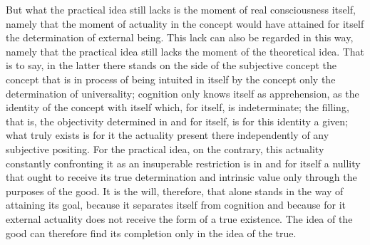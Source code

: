 But what the practical idea still lacks is the moment of real consciousness
itself, namely that the moment of actuality in the concept would have
attained for itself the determination of external being.
This lack can also
be regarded in this way, namely that the practical idea still lacks the moment
of the theoretical idea. That is to say, in the latter there stands on the side
of the subjective concept
the concept that is in process of being intuited
in itself by the concept
only the determination of universality; cognition
only knows itself as apprehension, as the identity of the concept with
itself which, for itself, is indeterminate; the filling, that is, the objectivity
determined in and for itself, is for this identity a given; what truly exists is for
it the actuality present there independently of any subjective positing. For
the practical idea, on the contrary, this actuality constantly confronting it
as an insuperable restriction is in and for itself a nullity that ought to receive
its true determination and intrinsic value only through the purposes of the
good. It is the will, therefore, that alone stands in the way of attaining its
goal, because it separates itself from cognition and because for it external
actuality does not receive the form of a true existence. The idea of the good
can therefore find its completion only in the idea of the true.

